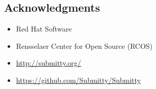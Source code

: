 \documentclass[thesis]{hmcposter}
\begin{document}
\begin{poster}
\section{Acknowledgments}
\begin{itemize}
    \item Red Hat Software
    \item Rensselaer Center for Open Source (RCOS)
    \item \url{http://submitty.org/}
    \item \url{https://github.com/Submitty/Submitty}
\end{itemize}

\end{poster}
\end{document}
